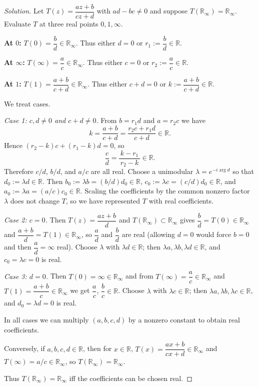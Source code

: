 \documentclass[12pt, a4paper]{report}
\theoremstyle{spaced}
\begin{document}
\begin{proof}[Solution]
	Let \(T(z)=\dfrac{az+b}{cz+d}\) with \(ad-bc\neq0\) and suppose
	\(T(\mathbb{R}_\infty)=\mathbb{R}_\infty\).
	Evaluate \(T\) at three real points \(0,1,\infty\).

	\smallskip
	\textbf{At \(0\):} \quad \(T(0)=\dfrac{b}{d}\in\mathbb{R}_\infty\).
	Thus either \(d=0\) or \(r_1:=\dfrac{b}{d}\in\mathbb{R}\).

	\textbf{At \(\infty\):} \quad \(T(\infty)=\dfrac{a}{c}\in\mathbb{R}_\infty\).
	Thus either \(c=0\) or \(r_2:=\dfrac{a}{c}\in\mathbb{R}\).

	\textbf{At \(1\):} \quad \(T(1)=\dfrac{a+b}{c+d}\in\mathbb{R}_\infty\).
	Thus either \(c+d=0\) or \(k:=\dfrac{a+b}{c+d}\in\mathbb{R}\).

	We treat cases.

	\medskip
	\emph{Case 1: \(c,d\neq0\) and \(c+d\neq0\).}
	From \(b=r_1 d\) and \(a=r_2 c\) we have
	\[
		k=\frac{a+b}{c+d}=\frac{r_2 c+r_1 d}{c+d}\in\mathbb{R}.
	\]
	Hence \((r_2-k)c+(r_1-k)d=0\), so
	\[
		\frac{c}{d}=\frac{k-r_1}{\,r_2-k\,}\in\mathbb{R}.
	\]
	Therefore \(c/d\), \(b/d\), and \(a/c\) are all real.  Choose a unimodular
	\(\lambda=e^{-i\arg d}\) so that \(d_0:=\lambda d\in\mathbb{R}\).
	Then \(b_0:=\lambda b=(b/d)d_0\in\mathbb{R}\), \(c_0:=\lambda c=(c/d)d_0\in\mathbb{R}\),
	and \(a_0:=\lambda a=(a/c)c_0\in\mathbb{R}\).
	Scaling the coefficients by the common nonzero factor \(\lambda\) does not change \(T\),
	so we have represented \(T\) with real coefficients.

	\medskip
	\emph{Case 2: \(c=0\).}
	Then \(T(z)=\dfrac{az+b}{d}\) and \(T(\mathbb{R}_\infty)\subset\mathbb{R}_\infty\) gives
	\(\dfrac{b}{d}=T(0)\in\mathbb{R}_\infty\) and \(\dfrac{a+b}{d}=T(1)\in\mathbb{R}_\infty\),
	so \(\dfrac{a}{d}\) and \(\dfrac{b}{d}\) are real (allowing \(d=0\) would force \(b=0\) and then
	\(\dfrac{a}{d}=\infty\) real).
	Choose \(\lambda\) with \(\lambda d\in\mathbb{R}\); then \(\lambda a,\lambda b,\lambda d\in\mathbb{R}\),
	and \(c_0=\lambda c=0\) is real.

	\medskip
	\emph{Case 3: \(d=0\).}
	Then \(T(0)=\infty\in\mathbb{R}_\infty\) and from \(T(\infty)=\dfrac{a}{c}\in\mathbb{R}_\infty\) and
	\(T(1)=\dfrac{a+b}{c}\in\mathbb{R}_\infty\) we get \(\dfrac{a}{c}\), \(\dfrac{b}{c}\in\mathbb{R}\).
	Choose \(\lambda\) with \(\lambda c\in\mathbb{R}\); then \(\lambda a,\lambda b,\lambda c\in\mathbb{R}\),
	and \(d_0=\lambda d=0\) is real.

	\medskip
	In all cases we can multiply \((a,b,c,d)\) by a nonzero constant to obtain real coefficients.

	\medskip
	Conversely, if \(a,b,c,d\in\mathbb{R}\), then for \(x\in\mathbb{R}\),
	\(T(x)=\dfrac{ax+b}{cx+d}\in\mathbb{R}_\infty\) and \(T(\infty)=a/c\in\mathbb{R}_\infty\),
	so \(T(\mathbb{R}_\infty)=\mathbb{R}_\infty\).

	\smallskip
	Thus \(T(\mathbb{R}_\infty)=\mathbb{R}_\infty\) iff the coefficients can be chosen real.
	\qedhere
\end{proof}
\end{document}
